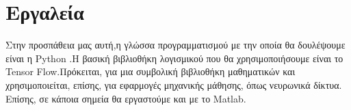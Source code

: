 \section{Εργαλεία}
Στην προσπάθεια μας αυτή,η γλώσσα προγραμματισμού με την οποία θα δουλέψουμε
είναι η Python .Η βασική βιβλιοθήκη λογισμικού που θα χρησιμοποιήσουμε είναι το
Tensor Flow.Πρόκειται, για μια συμβολική βιβλιοθήκη μαθηματικών και
χρησιμοποιείται, επίσης, για εφαρμογές μηχανικής μάθησης, όπως νευρωνικά δίκτυα.
Επίσης, σε κάποια σημεία θα εργαστούμε και με το Matlab.
